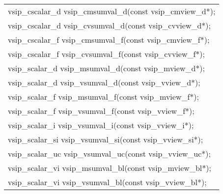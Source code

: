 \\\cvsiplh
\afh
\\\hspace*{.04\textwidth} {
\ttfamily
\begin{tabular}[H]{l}
vsip\_cscalar\_d vsip\_cmsumval\_d(const vsip\_cmview\_d*);\\
vsip\_cscalar\_d vsip\_cvsumval\_d(const vsip\_cvview\_d*);\\
vsip\_cscalar\_f vsip\_cmsumval\_f(const vsip\_cmview\_f*);\\
vsip\_cscalar\_f vsip\_cvsumval\_f(const vsip\_cvview\_f*);\\
vsip\_scalar\_d vsip\_msumval\_d(const vsip\_mview\_d*);\\
vsip\_scalar\_d vsip\_vsumval\_d(const vsip\_vview\_d*);\\
vsip\_scalar\_f vsip\_msumval\_f(const vsip\_mview\_f*);\\
vsip\_scalar\_f vsip\_vsumval\_f(const vsip\_vview\_f*);\\
vsip\_scalar\_i vsip\_vsumval\_i(const vsip\_vview\_i*);\\
vsip\_scalar\_si vsip\_vsumval\_si(const vsip\_vview\_si*);\\
vsip\_scalar\_uc vsip\_vsumval\_uc(const vsip\_vview\_uc*);\\
vsip\_scalar\_vi vsip\_msumval\_bl(const vsip\_mview\_bl*);\\
vsip\_scalar\_vi vsip\_vsumval\_bl(const vsip\_vview\_bl*);\\
\end{tabular}
}
\\\pyjvsiph